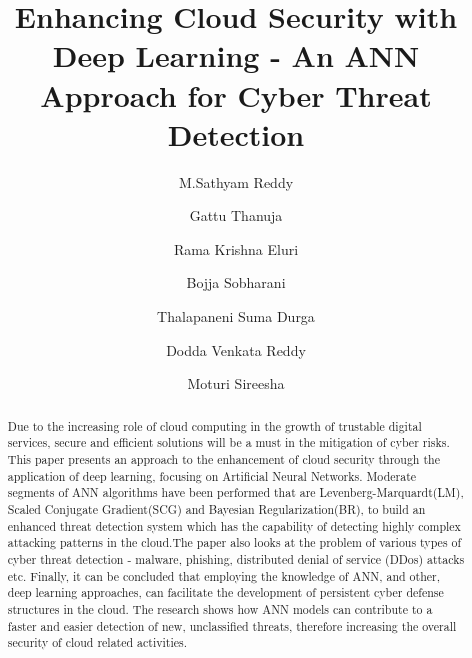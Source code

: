 \documentclass{llncs}
\begin{document}
%
\title{Enhancing Cloud Security with Deep Learning - An ANN
Approach for Cyber Threat Detection}
%
%
\author{M.Sathyam Reddy \and
Gattu Thanuja \and
Rama Krishna Eluri \and
Bojja Sobharani \and
Thalapaneni Suma Durga \and
Dodda Venkata Reddy \and
Moturi Sireesha
}


%
\maketitle             %
%
\begin{abstract}
Due to the increasing role of cloud computing in the growth of trustable digital services, secure and efficient solutions will be a must in the mitigation of cyber risks. This paper presents an approach to the enhancement of cloud security through the application of deep learning, focusing on Artificial Neural Networks. Moderate segments of ANN algorithms have been performed that are Levenberg-Marquardt(LM), Scaled Conjugate Gradient(SCG) and Bayesian Regularization(BR), to build an enhanced threat detection system which has the capability of detecting highly complex attacking patterns in the cloud.The paper also looks at the problem of various types of cyber threat detection - malware, phishing, distributed denial of service (DDos) attacks etc. Finally, it can be concluded that employing the knowledge of ANN, and other, deep learning approaches, can facilitate the development of persistent cyber defense structures in the cloud. The research shows how ANN models can contribute to a faster and easier detection of new, unclassified threats, therefore increasing the overall security of cloud related activities.

\end{abstract}
%
%
%
\end{document}
